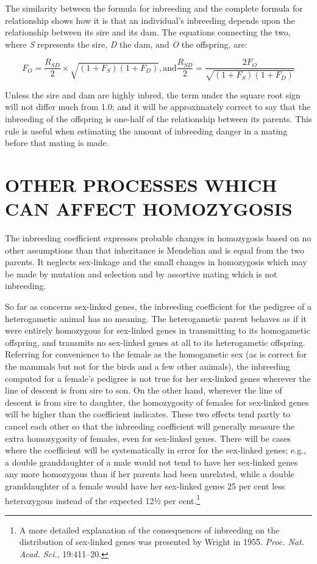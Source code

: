 The similarity between the formula for inbreeding and the complete
formula for relationship shows how it is that an individual's
inbreeding depends upon the relationship between its sire and its dam.
The equations connecting the two, where \textit{S} represents the sire, \textit{D} the
dam, and \textit{O} the offspring, are:

\[ F_O = \frac{R_{SD}}{2} \times \sqrt{(1 + F_S)(1 + F_D)}, \text{and} \frac{R_{SD}}{2} = \frac{2F_O}{\sqrt{(1 + F_S)(1 + F_D)}} \]

\noindent
Unless the sire and dam are highly inbred, the term under the square
root sign will not differ much from 1.0; and it will be approximately
correct to say that the inbreeding of the offspring is one-half of the relationship
between its parents. This rule is useful when estimating the
amount of inbreeding danger in a mating before that mating is made.

\section*{OTHER PROCESSES WHICH CAN AFFECT HOMOZYGOSIS}

The inbreeding coefficient expresses probable changes in homozygosis
based on no other assumptions than that inheritance is Mendelian
and is equal from the two parents. It neglects sex-linkage and the small
changes in homozygosis which may be made by mutation and selection
and by assortive mating which is not inbreeding.

So far as concerns sex-linked genes, the inbreeding coefficient for the
pedigree of a heterogametic animal has no meaning. The heterogametic
parent behaves as if it were entirely homozygous for sex-linked
genes in transmitting to its homogametic offspring, and transmits no
sex-linked genes at all to its heterogametic offspring. Referring for convenience
to the female as the homogametic sex (as is correct for the
mammals but not for the birds and a few other animals), the inbreeding
computed for a female's pedigree is not true for her sex-linked genes
wherever the line of descent is from sire to son. On the other hand,
wherever the line of descent is from sire to daughter, the homozygosity
of females for sex-linked genes will be higher than the coefficient indicates.
These two effects tend partly to cancel each other so that the
inbreeding coefficient will generally measure the extra homozygosity of
females, even for sex-linked genes. There will be cases where the coefficient
will be systematically in error for the sex-linked genes; e.g., a
double granddaughter of a male would not tend to have her sex-linked
genes any more homozygous than if her parents had been unrelated,
while a double granddaughter of a female would have her sex-linked
genes 25 per cent less heterozygous instead of the expected 12½ per
cent.\footnote{A more detailed explanation of the consequences of inbreeding on
the distribution of sex-linked genes was presented by Wright in 1955.
\textit{Proc. Nat. Acad. Sci.}, 19:411--20.}

